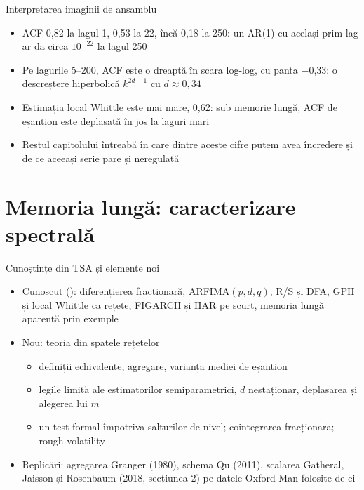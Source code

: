 \begin{frame}{Interpretarea imaginii de ansamblu}
\itemsize{\small}
\begin{itemize}
    \item ACF 0{,}82 la lagul 1, 0{,}53 la 22, încă 0{,}18 la 250: un AR(1) cu același prim lag ar da circa $10^{-22}$ la lagul 250
    \item Pe lagurile 5--200, ACF este o dreaptă în scara log-log, cu panta \ensuremath{-}0{,}33: o descreștere hiperbolică $k^{2d-1}$ cu $d \approx 0{,}34$
    \item Estimația local Whittle este mai mare, 0{,}62: sub memorie lungă, ACF de eșantion este deplasată în jos la laguri mari
    \item Restul capitolului întreabă în care dintre aceste cifre putem avea încredere și de ce aceeași serie pare și neregulată
\end{itemize}
\end{frame}


\section{Memoria lungă: caracterizare spectrală}

\begin{frame}{Cunoștințe din TSA și elemente noi}
\itemsize{\small}
\begin{itemize}
    \item Cunoscut (): diferențierea fracționară, ARFIMA$(p,d,q)$, R/S și DFA, GPH și local Whittle ca rețete, FIGARCH și HAR pe scurt, memoria lungă aparentă prin exemple
    \item Nou: teoria din spatele rețetelor
    \begin{itemize}
        \item definiții echivalente, agregare, varianța mediei de eșantion
        \item legile limită ale estimatorilor semiparametrici, $d$ nestaționar, deplasarea și alegerea lui $m$
        \item un test formal împotriva salturilor de nivel; cointegrarea fracționară; rough volatility
    \end{itemize}
    \item Replicări: agregarea Granger (1980), schema Qu (2011), scalarea Gatheral, Jaisson și Rosenbaum (2018, secțiunea 2) pe datele Oxford-Man folosite de ei
\end{itemize}
\end{frame}


